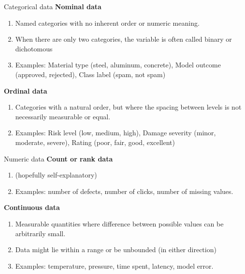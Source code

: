 \documentclass[12pt]{beamer}
\newcommand{\vocab}[1]{\textcolor{AggieMaroon}{\textbf{#1}}}
\begin{document}
\begin{frame}{}
\begin{block}{Categorical data}
\vocab{Nominal data}
\begin{enumerate}
\item Named categories with no inherent order or numeric meaning.
\item When there are only two categories, the variable is often called binary or dichotomous
\item Examples: Material type (steel, aluminum, concrete), Model outcome (approved, rejected), Class label (spam, not spam)
\end{enumerate}
\vocab{Ordinal data}
\begin{enumerate}
\item Categories with a natural order, but where the spacing between levels is not necessarily measurable or equal.
\item Examples: Risk level (low, medium, high), Damage severity (minor, moderate, severe), Rating (poor, fair, good, excellent)
\end{enumerate}
\end{block}
\end{frame}

\begin{frame}{}
\begin{block}{Numeric data}
\vocab{Count or rank data}
\begin{enumerate}
\item (hopefully self-explanatory)
\item Examples: number of defects, number of clicks, number of missing values.
\end{enumerate}
\vocab{Continuous data}
\begin{enumerate}
\item Measurable quantities where difference between possible values can be arbitrarily small.
\item Data might lie within a range or be unbounded (in either direction)
\item Examples: temperature, pressure, time spent, latency, model error.
\end{enumerate}
\end{block}
\end{frame}
\end{document}

